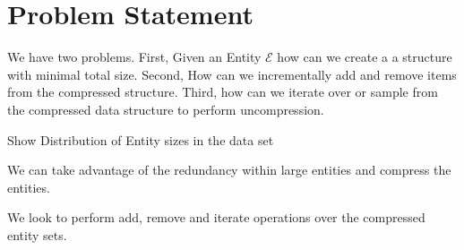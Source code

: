 
\section{Problem Statement}

We have two problems.
First,
Given an Entity $\mathcal{E}$ how can we create a
a structure with minimal total size.
Second, How can we incrementally add and remove items 
from the compressed structure.
Third, how can we iterate over or sample from the
compressed data structure to perform uncompression.




Show Distribution of Entity sizes in the data set

We can take advantage of the redundancy within
large entities and compress the entities.

We look to perform add, remove and iterate operations
over the compressed entity sets.  




